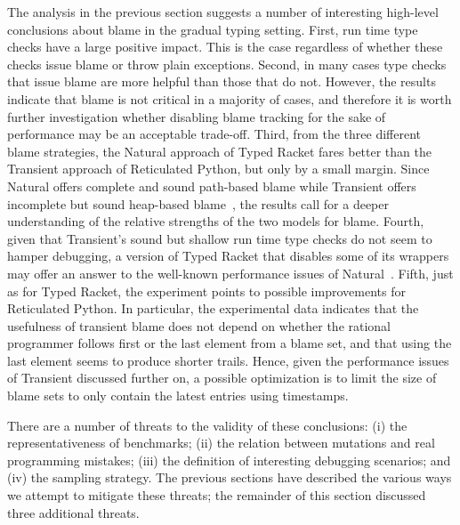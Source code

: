 


The analysis in the previous section suggests a number of interesting
high-level conclusions about blame in the gradual typing setting.  First,
run time type checks have a large positive impact. This is the case
regardless of whether these checks issue blame or throw plain
exceptions.  Second, in many cases type checks that issue blame are more
helpful than those that do not. However, the results indicate that blame
is not critical in a majority of cases, and therefore it is worth further
investigation whether disabling blame tracking for the sake of performance
may be   an acceptable trade-off. Third, from the three different blame
strategies, the Natural approach of Typed Racket fares better than the
Transient approach of Reticulated Python, but only by a small margin.
Since Natural offers complete and sound path-based blame while Transient
offers incomplete but sound heap-based blame~\cite{gfd-oopsla-2019}, the
results call for a deeper understanding of the relative strengths of the
two models for blame.  Fourth, given that Transient's sound but shallow
run time type checks do not seem to hamper debugging, a version of Typed
Racket that disables some of its wrappers may offer an answer to the
well-known performance issues of Natural~\cite{gtnffvf-jfp-2019}.  Fifth,
just as for Typed Racket, the experiment points to possible improvements
for Reticulated Python. In particular, the experimental data indicates
that the usefulness of transient blame does not depend on whether  the
rational programmer follows first or the last element from a blame set,
and that using the last element seems to produce shorter trails.  Hence,
given the performance issues of Transient discussed further on, a possible
optimization is to limit the size of blame sets to only contain the latest
entries using timestamps.

There are a number of threats to the validity of these conclusions: (i) the
representativeness of benchmarks; (ii) the relation between mutations and
real programming mistakes; (iii) the definition of interesting debugging
scenarios; and (iv) the sampling strategy. The previous sections
have described the various ways we attempt to mitigate these threats;
the remainder of this section discussed three additional threats.

